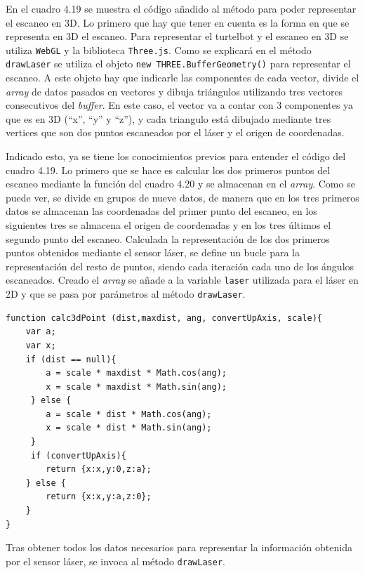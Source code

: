 En el cuadro 4.19 se muestra el código añadido al método para poder representar el escaneo en 3D. Lo primero que hay que tener en cuenta es la forma en que se representa en 3D el escaneo. Para representar el turtelbot y el escaneo en 3D se utiliza \texttt{WebGL} y la biblioteca \texttt{Three.js}. Como se explicará en el método \texttt{drawLaser} se utiliza el objeto \texttt{new THREE.BufferGeometry()} para representar el escaneo. A este objeto hay que indicarle las componentes de cada vector, divide el \textit{array} de datos pasados en vectores y dibuja triángulos utilizando tres vectores consecutivos del \textit{buffer}. En este caso, el vector va a contar con 3 componentes ya que es en 3D (``x'', ``y'' y ``z''), y cada triangulo está dibujado mediante tres vertices que son dos puntos escaneados por el láser y el origen de coordenadas.

Indicado esto, ya se tiene los conocimientos previos para entender el código del cuadro 4.19. Lo primero que se hace es calcular los dos primeros puntos del escaneo mediante la función del cuadro 4.20 y se almacenan en el \textit{array}. Como se puede ver, se divide en grupos de nueve datos, de manera que en los tres primeros datos se almacenan las coordenadas del primer punto del escaneo, en los siguientes tres se almacena el origen de coordenadas y en los tres últimos el segundo punto del escaneo. Calculada la representación de los dos primeros puntos obtenidos mediante el sensor láser, se define un bucle para la representación del resto de puntos, siendo cada iteración cada uno de los ángulos escaneados. Creado el \textit{array} se añade a la variable \texttt{laser} utilizada para el láser en 2D y que se pasa por parámetros al método \texttt{drawLaser}.


\begin{lstlisting}[caption= Calcular las coordenadas 3D, label=cod.lasercoor3d]
function calc3dPoint (dist,maxdist, ang, convertUpAxis, scale){
	var a;
	var x;
	if (dist == null){
		a = scale * maxdist * Math.cos(ang);
		x = scale * maxdist * Math.sin(ang);
	 } else {
	 	a = scale * dist * Math.cos(ang);
		x = scale * dist * Math.sin(ang);
	 }
	 if (convertUpAxis){
	 	return {x:x,y:0,z:a};
	} else {
		return {x:x,y:a,z:0};
	}
}
\end{lstlisting}

Tras obtener todos los datos necesarios para representar la información obtenida por el sensor láser, se invoca al método \texttt{drawLaser}.

